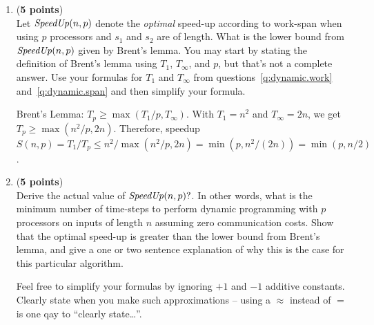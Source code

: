 \documentclass{article}
\newenvironment{answer}
{\color{blue}}
{\normalfont}
\begin{document}
\begin{enumerate}
\begin{enumerate}
                    \begin{answer}
                        $T_\infty = \Theta(2n)$. Using diagonal parallelism, cells where $i+j=k$ can be computed in parallel. The diagonals range from $k=2$ to $k=2n$, requiring $2n-1 \approx 2n$ sequential steps.
                    \end{answer}
              \item (\textbf{5 points})\\
                    Let $\mathit{SpeedUp}(n, p)$ denote the \emph{optimal} speed-up according to work-span when using $p$ processors
                    and $s_1$ and $s_2$ are of length.
                    What is the lower bound from $\mathit{SpeedUp}(n, p)$ given by Brent's lemma.  You may start by stating the
                    definition of Brent's lemma using $T_1$, $T_{\infty}$, and $p$, but that's not a complete answer.
                    Use your formulas for $T_1$ and $T_{\infty}$ from questions~\ref{q:dynamic.work} and~\ref{q:dynamic.span}
                    and then simplify your formula.

                    \begin{answer}
                        Brent's Lemma: $T_p \geq \max(T_1/p, T_\infty)$. With $T_1 = n^2$ and $T_\infty = 2n$, we get $T_p \geq \max(n^2/p, 2n)$. Therefore, speedup $S(n,p) = T_1/T_p \leq n^2/\max(n^2/p, 2n) = \min(p, n^2/(2n)) = \min(p, n/2)$.
                    \end{answer}
              \item (\textbf{5 points})\\
                    Derive the actual value of $\mathit{SpeedUp}(n, p)?$.  In other words, what is the minimum number of time-steps
                    to perform dynamic programming with $p$ processors on inputs of length $n$ assuming zero communication costs.
                    Show that the optimal speed-up is greater than the lower bound from Brent's lemma, and give a one or two sentence
                    explanation of why this is the case for this particular algorithm.
                    \par\noindent%
                    Feel free to simplify your formulas by ignoring $+1$ and $-1$ additive constants.
                    Clearly state when you make such approximations -- using a $\approx$ instead of $=$
                    is one qay to ``clearly state\ldots''.


\end{enumerate}
\end{enumerate}
\end{document}
